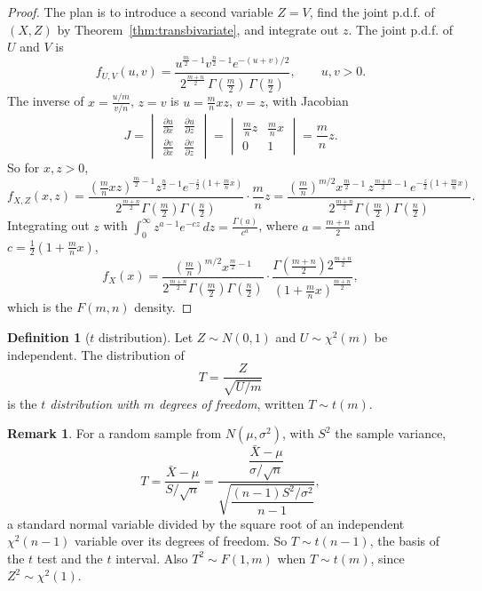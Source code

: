 \documentclass[12pt,a4paper]{report}
\theoremstyle{definition}
\newtheorem{definition}[thm]{Definition}
\newtheorem{remark}[thm]{Remark}
\theoremstyle{plain}
\begin{document}
\begin{proof}
The plan is to introduce a second variable $Z = V$, find the joint p.d.f. of
$(X,Z)$ by Theorem~\ref{thm:transbivariate}, and integrate out $z$. The joint
p.d.f. of $U$ and $V$ is
\[f_{U,V}(u,v) = \frac{u^{\frac{m}{2}-1}v^{\frac{n}{2}-1}
e^{-(u+v)/2}}{2^{\frac{m + n}{2}}\, \Gamma \left(\frac{m}{2}\right) \,
\Gamma\left(\frac{n}{2}\right)} ,\qquad u,v>0 .\]
The inverse of $x = \frac{u/m}{v/n}$, $z = v$ is $u = \frac{m}{n}xz$, $v = z$, with
Jacobian
\[J = \begin{vmatrix}
\frac{\partial u}{\partial x} & \frac{\partial u}{\partial z}\\[1ex]
\frac{\partial v}{\partial x} & \frac{\partial v}{\partial z}
\end{vmatrix} = \begin{vmatrix}
\frac{m}{n}z & \frac{m}{n}x\\
0 & 1
\end{vmatrix} = \frac{m}{n}z .\]
So for $x,z>0$,
\[f_{X,Z}(x,z) = \frac{\left(\frac{m}{n}xz\right)^{\frac{m}{2}-1}
z^{\frac{n}{2}-1} e^{-\frac{z}{2}\left(1 + \frac{m}{n}x\right)}}{2^{\frac{m+n}{2}}
\Gamma \left(\frac{m}{2}\right)\Gamma \left(\frac{n}{2}\right)}\cdot\frac{m}{n}z =
\frac{\left(\frac{m}{n}\right)^{m/2}x^{\frac{m}{2}-1}\, z^{\frac{m+n}{2}-1}\,
e^{-\frac{z}{2}\left(1 + \frac{m}{n}x\right)}}{2^{\frac{m+n}{2}} \Gamma
\left(\frac{m}{2}\right)\Gamma \left(\frac{n}{2}\right)} .\]
Integrating out $z$ with $\int_0^\infty z^{a-1}e^{-cz}\,dz = \frac{\Gamma(a)}{c^a}$,
where $a = \frac{m+n}{2}$ and $c = \frac12\left(1 + \frac mnx\right)$,
\[f_X(x) = \frac{\left(\frac{m}{n}\right)^{m/2}x^{\frac{m}{2}-1}}{2^{\frac{m+n}{2}}
\Gamma \left(\frac{m}{2}\right)\Gamma \left(\frac{n}{2}\right)}\cdot\frac{\Gamma
\left(\frac{m + n}{2}\right)2^{\frac{m+n}{2}}}{\left(1 + \frac{m}{n}x\right)^{
\frac{m+n}{2}}},\]
which is the $F(m,n)$ density.
\end{proof}

\begin{definition}[$t$ distribution]
\label{def:tdist}
Let $Z\sim N(0,1)$ and $U\sim\chi^2(m)$ be independent. The distribution of
\[ T = \frac{Z}{\sqrt{U/m}}\]
is the \emph{$t$ distribution with $m$ degrees of freedom}, written $T\sim t(m)$.
\end{definition}

\begin{remark}
For a random sample from $N(\mu,\sigma^2)$, with $S^2$ the sample variance,
\[T = \frac{\bar X - \mu}{S/\sqrt n} = \frac{\dfrac{\bar X - \mu}{\sigma /
\sqrt{n}}}{\sqrt{\dfrac{(n-1)S^2/\sigma^2}{n-1}}} ,\]
a standard normal variable divided by the square root of an independent
$\chi^2(n - 1)$ variable over its degrees of freedom. So $T\sim t(n - 1)$, the
basis of the $t$ test and the $t$ interval. Also $T^2\sim F(1,m)$ when
$T\sim t(m)$, since $Z^2\sim\chi^2(1)$.
\end{remark}
\end{document}
